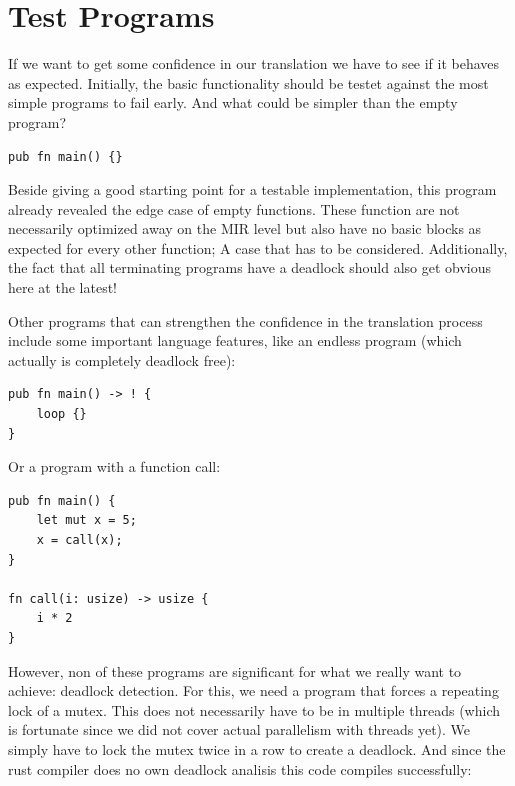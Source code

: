 \section{Test Programs}
\label{app_test}
If we want to get some confidence in our translation we have to see if it behaves as expected.
Initially, the basic functionality should be testet against the most simple programs to fail early.
And what could be simpler than the empty program?
\begin{lstlisting}
pub fn main() {}
\end{lstlisting}
Beside giving a good starting point for a testable implementation, this program already revealed the edge case of empty functions.
These function are not necessarily optimized away on the MIR level but also have no basic blocks as expected for every other function;
A case that has to be considered.
Additionally, the fact that all terminating programs have a deadlock should also get obvious here at the latest!

Other programs that can strengthen the confidence in the translation process include some important language features, like an endless program (which actually is completely deadlock free):

\begin{lstlisting}
pub fn main() -> ! {
    loop {}
}
\end{lstlisting}
Or a program with a function call:

\begin{lstlisting}
pub fn main() {
    let mut x = 5;
    x = call(x);
}

fn call(i: usize) -> usize {
    i * 2
}
\end{lstlisting}

However, non of these programs are significant for what we really want to achieve: deadlock detection.
For this, we need a program that forces a repeating lock of a mutex.
This does not necessarily have to be in multiple threads
(which is fortunate since we did not cover actual parallelism with threads yet).
We simply have to lock the mutex twice in a row to create a deadlock.
And since the rust compiler does no own deadlock analisis this code compiles successfully:

